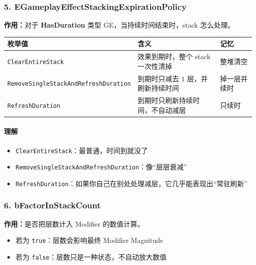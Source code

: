 \documentclass[CJKmath=true,10pt]{MyBook}
\begin{document}
\subsubsection{5. EGameplayEffectStackingExpirationPolicy}

\textbf{作用：}对于 \textbf{HasDuration} 类型 GE，当持续时间结束时，stack 怎么处理。

\begin{longtable}{@{}p{}p{}p{}@{}}
	\toprule
	\textbf{枚举值} & \textbf{含义} & \textbf{记忆} \\
	\midrule
	\endhead
	
	\texttt{ClearEntireStack}
	&
	效果到期时，整个 stack 一次性清掉
	&
	整堆清空
	\\
	
	\texttt{RemoveSingleStackAndRefreshDuration}
	&
	到期时只减去 $1$ 层，并刷新持续时间
	&
	掉一层并续时
	\\
	
	\texttt{RefreshDuration}
	&
	到期时只刷新持续时间，不自动减层
	&
	只续时
	\\
	
	\bottomrule
\end{longtable}

\paragraph{理解}
\begin{itemize}
	\item \texttt{ClearEntireStack}：最普通，时间到就没了
	\item \texttt{RemoveSingleStackAndRefreshDuration}：像“层层衰减”
	\item \texttt{RefreshDuration}：如果你自己在别处处理减层，它几乎能表现出“常驻刷新”
\end{itemize}

\subsubsection{6. bFactorInStackCount}

\textbf{作用：}是否把层数计入 Modifier 的数值计算。

\begin{itemize}
	\item 若为 \texttt{true}：层数会影响最终 Modifier Magnitude
	\item 若为 \texttt{false}：层数只是一种状态，不自动放大数值
\end{itemize}
\end{document}
